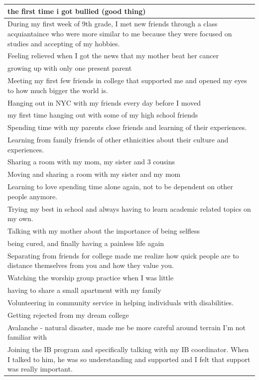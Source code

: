 \documentclass[
  .7em,
  letterpaper,
  DIV=11,
  numbers=noendperiod]{scrartcl}
\begin{document}
\begin{table}
\begin{tabular}{l}
\hline
the first time i got bullied (good thing)\\
\hline
During my first week of 9th grade, I met new friends through a class acquiantaince who were more similar to me because they were focused on studies and accepting of my hobbies.\\
\hline
Feeling relieved when I got the news that my mother beat her cancer\\
\hline
growing up with only one present parent\\
\hline
Meeting my first few friends in college that supported me and opened my eyes to how much bigger the world is.\\
\hline
Hanging out in NYC with my friends every day before I moved\\
\hline
my first time hanging out with some of my high school friends\\
\hline
Spending time with my parents close friends and learning of their experiences.\\
\hline
Learning from family friends of other ethnicities about their culture and experiences.\\
\hline
Sharing a room with my mom, my sister and 3 cousins\\
\hline
Moving and sharing a room with my sister and my mom\\
\hline
Learning to love spending time alone again, not to be dependent on other people anymore.\\
\hline
Trying my best in school and always having to learn academic related topics on my own.\\
\hline
Talking with my mother about the importance of being selfless\\
\hline
being cured, and finally having a painless life again\\
\hline
Separating from friends for college made me realize how quick people are to distance themselves from you and how they value you.\\
\hline
Watching the worship group practice when I was little\\
\hline
having to share a small apartment with my family\\
\hline
Volunteering in community service in helping individuals with disabilities.\\
\hline
Getting rejected from my dream college\\
\hline
Avalanche - natural disaster, made me be more careful around terrain I'm not familiar with\\
\hline
Joining the IB program and specifically talking with my IB coordinator. When I talked to him, he was so understanding and supported and I felt that support was really important.\\

\end{tabular}
\end{table}
\end{document}
